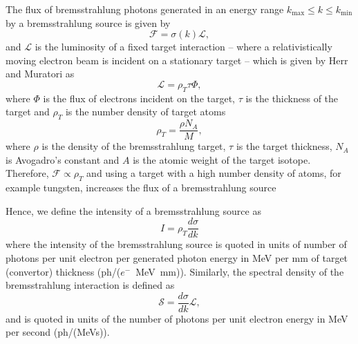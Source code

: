 \documentclass[../main.tex]{subfiles}
\begin{document}
The flux of bremsstrahlung photons generated in an energy range $k_{\mathrm{max}} \leq k \leq k_{\mathrm{min}}$ by a bremsstrahlung source is given by
\begin{equation}
\mathcal{F} = \sigma\left(k\right)\mathcal{L},    
\end{equation}
and $\mathcal{L}$ is the luminosity of a fixed target interaction -- where a relativistically moving electron beam is incident on a stationary target -- which is given by Herr and Muratori \cite{herr2006concept} as
\begin{equation}
\mathcal{L} = \rho_{T}\tau\Phi,     
\end{equation}
where $\Phi$ is the flux of electrons incident on the target, $\tau$ is the thickness of the target and $\rho_{T}$ is the number density of target atoms
\begin{equation}
\rho_{T} = \frac{\rho N_{A}}{M},
\label{eq:target_number_density}    
\end{equation}
where $\rho$ is the density of the bremsstrahlung target, $\tau$ is the target thickness, $N_{A}$ is Avogadro's constant and $A$ is the atomic weight of the target isotope. Therefore, $\mathcal{F} \propto \rho_{T}$ and using a target with a high number density of atoms, for example tungsten, increases the flux of a bremsstrahlung source

Hence, we define the intensity of a bremsstrahlung source as
\begin{equation}
I = \rho_{T}\frac{d\sigma}{dk}
\label{eq:bremsstrahlung_intensity}    
\end{equation}
where the intensity of the bremsstrahlung source is quoted in units of number of photons per unit electron per generated photon energy in \si{\mega\electronvolt} per \si{\milli\meter} of target (convertor) thickness (ph/($e^{-}$~\si{\mega\electronvolt}~\si{\milli\meter})). Similarly, the spectral density of the bremsstrahlung interaction is defined as
\begin{equation}
\mathcal{S} = \frac{d\sigma}{dk}\mathcal{L},
\label{eq:bremsstrahlung_spectral_density}    
\end{equation}
and is quoted in units of the number of photons per unit electron energy in \si{\mega\electronvolt} per second (ph/(\si{\mega\electronvolt}\si{\second})).
\end{document}
